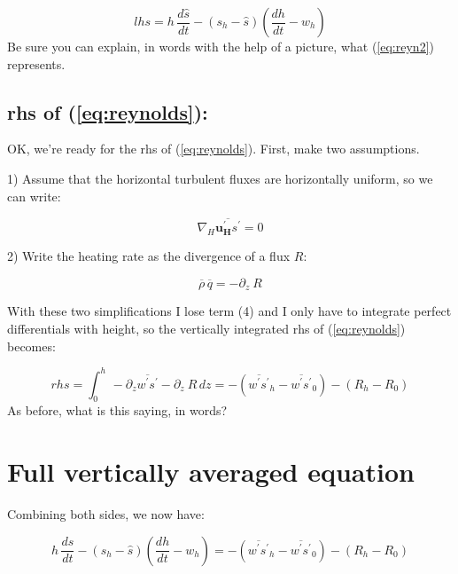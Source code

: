 \documentclass[12pt]{article}
\newcommand{\vect}[1]{\mathbf{{#1}}}
\begin{document}
\begin{equation}
  \label{eq:reyn2}
lhs =  h \,\frac{d \hat{s}}{dt} - (s_h - \hat{s} )
\left (\frac{dh}{dt} - w_h \right )
\end{equation}
Be sure you can explain, in words with the help of a picture, what
(\ref{eq:reyn2}) represents.


\subsection{rhs of (\ref{eq:reynolds}):}
\label{sec:rhs}

OK, we're ready for the rhs of (\ref{eq:reynolds}).  First, make two assumptions.

1) Assume that the horizontal turbulent fluxes are horizontally uniform, so
we can write:

\begin{equation}
  \label{eq:lose1}
  \nabla_H \overline{\vect{u_H^\prime} s^\prime} = 0
\end{equation}

2) Write the heating rate as the divergence of a flux $R$:

\begin{equation}
  \label{eq:heating}
  \overline{\rho}\, \overline{q} = -\partial_z \ R
\end{equation}

With these two simplifications I lose term (4) and I only have to integrate perfect differentials
with height, so the vertically integrated rhs of (\ref{eq:reynolds}) becomes:


\begin{equation}
  \label{eq:reynoldsint}
rhs = \int_0^h \,- \partial_z \overline{w^\prime s^\prime}  - \partial_z \ R \,dz
= - \left ( \overline{w^\prime s^\prime}_h - \overline{w^\prime s^\prime}_0 \right ) - ( R_h  - R_0 )
\end{equation}
As before, what is this saying, in words?

\section{Full vertically averaged equation}
\label{sec:fullint}

Combining both sides, we now have:

\begin{equation}
  \label{eq:combine}
  h \,\frac{d \hat{s}}{dt} - (s_h - \hat{s} )
\left (\frac{dh}{dt} - w_h \right ) = - \left ( \overline{w^\prime s^\prime}_h - \overline{w^\prime s^\prime}_0 \right ) - ( R_h  - R_0 )
\end{equation}
\end{document}
